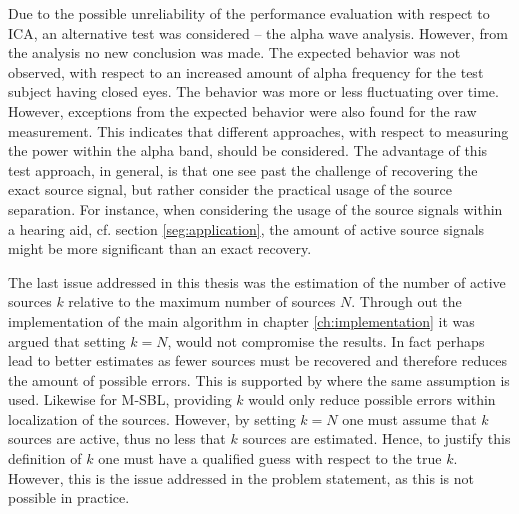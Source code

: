 Due to the possible unreliability of the performance evaluation with respect to ICA, an alternative test was considered -- the alpha wave analysis. 
However, from the analysis no new conclusion was made. The expected behavior was not observed, with respect to an increased amount of alpha frequency for the test subject having closed eyes.
The behavior was more or less fluctuating over time. However, exceptions from the expected behavior were also found for the raw measurement. This indicates that different approaches, with respect to measuring the power within the alpha band, should be considered.
The advantage of this test approach, in general, is that one see past the challenge of recovering the exact source signal, but rather consider the practical usage of the source separation. For instance, when considering the usage of the source signals within a hearing aid, cf. section \ref{seg:application}, the amount of active source signals might be more significant than an exact recovery.         

The last issue addressed in this thesis was the estimation of the number of active sources $k$ relative to the maximum number of sources $N$. Through out the implementation of the main algorithm in chapter \ref{ch:implementation} it was argued that setting $k = N$, would not compromise the results. 
In fact perhaps lead to better estimates as fewer sources must be recovered and therefore reduces the amount of possible errors.
This is supported by \cite{Balkan2014} where the same assumption is used.
Likewise for M-SBL, providing $k$ would only reduce possible errors within localization of the sources.
However, by setting $k = N$ one must assume that $k$ sources are active, thus no less that $k$ sources are estimated. 
Hence, to justify this definition of $k$ one must have a qualified guess with respect to the true $k$. 
However, this is the issue addressed in the problem statement, as this is not possible in practice.    

